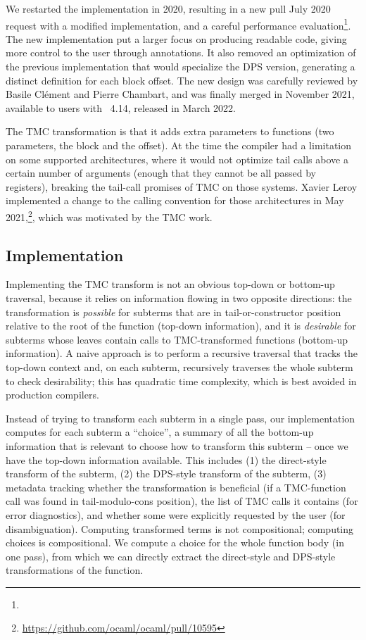 We restarted the implementation in 2020, resulting in a new pull July 2020 request with a modified implementation, and a careful performance
evaluation\footnote{}. The
new implementation put a larger focus on producing readable code,
giving more control to the user through annotations. It also removed
an optimization of the previous implementation that would specialize
the DPS version, generating a distinct definition for each block
offset. The new design was carefully reviewed by Basile Clément and
Pierre Chambart, and was finally merged in November 2021, available to
users with \OCaml~4.14, released in March 2022.

The TMC transformation is that it adds extra parameters to functions
(two parameters, the block and the offset). At the time the \OCaml
compiler had a limitation on some supported architectures, where it
would not optimize tail calls above a certain number of arguments
(enough that they cannot be all passed by registers), breaking the
tail-call promises of TMC on those systems. Xavier Leroy implemented
a change to the \OCaml calling convention for those architectures in
May 2021,\footnote{\url{https://github.com/ocaml/ocaml/pull/10595}},
which was motivated by the TMC work.

\subsection{Implementation}
\label{subsec:implementation}

Implementing the TMC transform is not an obvious top-down or bottom-up traversal, because it relies on information flowing in two opposite directions: the transformation is \emph{possible} for subterms that are in tail-or-constructor position relative to the root of the function (top-down information), and it is \emph{desirable} for subterms whose leaves contain calls to TMC-transformed functions (bottom-up information). A naive approach is to perform a recursive traversal that tracks the top-down context and, on each subterm, recursively traverses the whole subterm to check desirability; this has quadratic time complexity, which is best avoided in production compilers.

Instead of trying to transform each subterm in a single pass, our implementation computes for each subterm a ``choice'', a summary of all the bottom-up information that is relevant to choose how to transform this subterm -- once we have the top-down information available. This includes (1) the direct-style transform of the subterm, (2) the DPS-style transform of the subterm, (3) metadata tracking whether the transformation is beneficial (if a TMC-function call was found in tail-modulo-cons position), the list of TMC calls it contains (for error diagnostics), and whether some were explicitly requested by the user (for disambiguation). Computing transformed terms is not compositional; computing choices is compositional. We compute a choice for the whole function body (in one pass), from which we can directly extract the direct-style and DPS-style transformations of the function.

